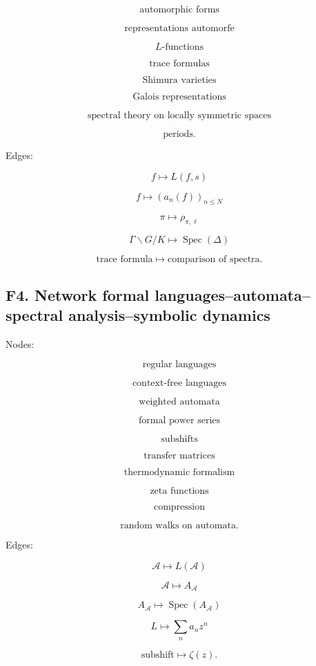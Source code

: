 \documentclass[11pt]{article}
\begin{document}
\[
\text{automorphic forms}
\]

\[
\text{representations automorfe}
\]

\[
L\text{-functions}
\]

\[
\text{trace formulas}
\]

\[
\text{Shimura varieties}
\]

\[
\text{Galois representations}
\]

\[
\text{spectral theory on locally symmetric spaces}
\]

\[
\text{periods}.
\]

Edges:

\[
f\mapsto L(f,s)
\]

\[
f\mapsto (a_n(f))_{n\le N}
\]

\[
\pi\mapsto \rho_{\pi,\ell}
\]

\[
\Gamma\backslash G/K\mapsto \operatorname{Spec}(\Delta)
\]

\[
\text{trace formula}\mapsto \text{comparison of spectra}.
\]



\subsection{F4. Network formal languages--automata--spectral analysis--symbolic dynamics}

Nodes:

\[
\text{regular languages}
\]

\[
\text{context-free languages}
\]

\[
\text{weighted automata}
\]

\[
\text{formal power series}
\]

\[
\text{subshifts}
\]

\[
\text{transfer matrices}
\]

\[
\text{thermodynamic formalism}
\]

\[
\text{zeta functions}
\]

\[
\text{compression}
\]

\[
\text{random walks on automata}.
\]

Edges:

\[
\mathcal A\mapsto L(\mathcal A)
\]

\[
\mathcal A\mapsto A_{\mathcal A}
\]

\[
A_{\mathcal A}\mapsto \operatorname{Spec}(A_{\mathcal A})
\]

\[
L\mapsto \sum_n a_nz^n
\]

\[
\text{subshift}\mapsto \zeta(z).
\]
\end{document}
